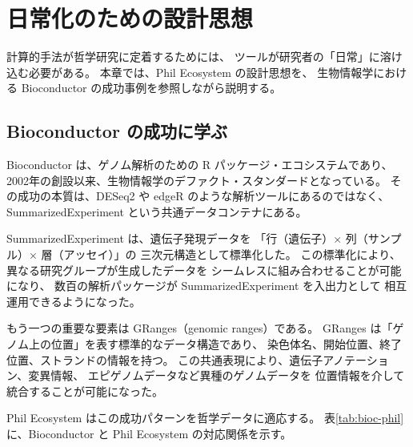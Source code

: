 \documentclass[a4paper,11pt]{ltjsarticle}
\begin{document}
\section{日常化のための設計思想}\label{sec:design}

計算的手法が哲学研究に定着するためには、
ツールが研究者の「日常」に溶け込む必要がある。
本章では、Phil Ecosystem の設計思想を、
生物情報学における Bioconductor の成功事例を参照しながら説明する。

\subsection{Bioconductor の成功に学ぶ}

Bioconductor\cite{huber2015} は、ゲノム解析のための R パッケージ・エコシステムであり、
2002年の創設以来、生物情報学のデファクト・スタンダードとなっている。
その成功の本質は、DESeq2 や edgeR のような解析ツールにあるのではなく、
SummarizedExperiment\cite{morgan2018} という共通データコンテナにある。

SummarizedExperiment は、遺伝子発現データを
「行（遺伝子）$\times$ 列（サンプル）$\times$ 層（アッセイ）」の
三次元構造として標準化した。
この標準化により、異なる研究グループが生成したデータを
シームレスに組み合わせることが可能になり、
数百の解析パッケージが SummarizedExperiment を入出力として
相互運用できるようになった。

もう一つの重要な要素は GRanges（genomic ranges）である。
GRanges は「ゲノム上の位置」を表す標準的なデータ構造であり、
染色体名、開始位置、終了位置、ストランドの情報を持つ。
この共通表現により、遺伝子アノテーション、変異情報、
エピゲノムデータなど異種のゲノムデータを
位置情報を介して統合することが可能になった。

Phil Ecosystem はこの成功パターンを哲学データに適応する。
表\ref{tab:bioc-phil}に、Bioconductor と Phil Ecosystem の対応関係を示す。
\end{document}
